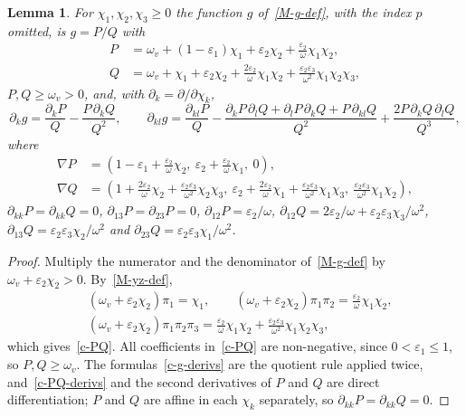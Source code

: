 \documentclass[11pt]{article}
\theoremstyle{plain}
\newtheorem{lemma}[theorem]{Lemma}
\theoremstyle{remark}
\numberwithin{equation}{section}
\begin{document}
\begin{lemma}\label{c-g}
For $\chi_1,\chi_2,\chi_3\ge 0$ the function $g$ of~\eqref{M-g-def}, with the
index $p$ omitted, is $g=P/Q$ with
\begin{equation}\label{c-PQ}
\begin{aligned}
P&=\omega_v+(1-\varepsilon_1)\chi_1+\varepsilon_2\chi_2+\frac{\varepsilon_2}{\omega}\chi_1\chi_2,\\
Q&=\omega_v+\chi_1+\varepsilon_2\chi_2+\frac{2\varepsilon_2}{\omega}\chi_1\chi_2
+\frac{\varepsilon_2\varepsilon_3}{\omega^2}\chi_1\chi_2\chi_3 ,
\end{aligned}
\end{equation}
$P,Q\ge\omega_v>0$, and, with $\partial_k=\partial/\partial\chi_k$,
\begin{equation}\label{c-g-derivs}
\partial_kg=\frac{\partial_kP}{Q}-\frac{P\,\partial_kQ}{Q^2},\qquad
\partial_{kl}g=\frac{\partial_{kl}P}{Q}
-\frac{\partial_kP\,\partial_lQ+\partial_lP\,\partial_kQ+P\,\partial_{kl}Q}{Q^2}
+\frac{2P\,\partial_kQ\,\partial_lQ}{Q^3},
\end{equation}
where
\begin{equation}\label{c-PQ-derivs}
\begin{aligned}
\nabla P&=\left(1-\varepsilon_1+\frac{\varepsilon_2}{\omega}\chi_2,\
\varepsilon_2+\frac{\varepsilon_2}{\omega}\chi_1,\ 0\right),\\
\nabla Q&=\left(1+\frac{2\varepsilon_2}{\omega}\chi_2+\frac{\varepsilon_2\varepsilon_3}{\omega^2}\chi_2\chi_3,\
\varepsilon_2+\frac{2\varepsilon_2}{\omega}\chi_1+\frac{\varepsilon_2\varepsilon_3}{\omega^2}\chi_1\chi_3,\
\frac{\varepsilon_2\varepsilon_3}{\omega^2}\chi_1\chi_2\right),
\end{aligned}
\end{equation}
$\partial_{kk}P=\partial_{kk}Q=0$, $\partial_{13}P=\partial_{23}P=0$,
$\partial_{12}P=\varepsilon_2/\omega$,
$\partial_{12}Q=2\varepsilon_2/\omega+\varepsilon_2\varepsilon_3\chi_3/\omega^2$,
$\partial_{13}Q=\varepsilon_2\varepsilon_3\chi_2/\omega^2$ and
$\partial_{23}Q=\varepsilon_2\varepsilon_3\chi_1/\omega^2$.
\end{lemma}
\begin{proof}
Multiply the numerator and the denominator of~\eqref{M-g-def} by
$\omega_v+\varepsilon_2\chi_2>0$. By~\eqref{M-yz-def},
\begin{align*}
&\left(\omega_v+\varepsilon_2\chi_2\right)\pi_1=\chi_1,\qquad
\left(\omega_v+\varepsilon_2\chi_2\right)\pi_1\pi_2=\frac{\varepsilon_2}{\omega}\chi_1\chi_2,\\
&\left(\omega_v+\varepsilon_2\chi_2\right)\pi_1\pi_2\pi_3
=\frac{\varepsilon_2}{\omega}\chi_1\chi_2+\frac{\varepsilon_2\varepsilon_3}{\omega^2}\chi_1\chi_2\chi_3,
\end{align*}
which gives~\eqref{c-PQ}. All coefficients in~\eqref{c-PQ} are non-negative,
since $0<\varepsilon_1\le 1$, so $P,Q\ge\omega_v$. The formulas~\eqref{c-g-derivs}
are the quotient rule applied twice, and~\eqref{c-PQ-derivs} and the second
derivatives of $P$ and $Q$ are direct differentiation; $P$ and $Q$ are affine
in each $\chi_k$ separately, so $\partial_{kk}P=\partial_{kk}Q=0$.
\end{proof}
\end{document}

